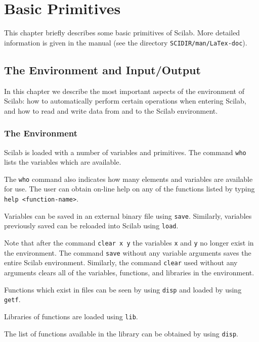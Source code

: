 
\chapter{Basic Primitives}
\label{ch5}
This chapter briefly describes some basic primitives of Scilab.
More detailed information is given in the manual 
(see the directory {\tt SCIDIR/man/LaTex-doc}).
\section{The Environment and Input/Output}
	In this chapter we describe the most important aspects
of the environment of Scilab: how to automatically
perform certain operations when entering Scilab,
and how to read and write data
from and to the Scilab environment.

\subsection{The Environment}
\label{s5.1}

 Scilab is loaded with a number of variables and primitives.
The command {\tt who} lists the variables 
which are available.  

The {\tt who} command also indicates how many elements and variables
are available for use.  The user can obtain on-line help on any of 
the functions listed by typing {\tt help <function-name>}.

	Variables can be saved in an external binary
file using {\tt save}.  
Similarly, variables previously saved can be
reloaded into Scilab using {\tt load}.

Note that after the command {\tt clear x y} 
 the variables {\tt x} and
{\tt y} no longer exist in the environment.  
The command {\tt save} without any variable arguments saves the entire 
Scilab environment.  Similarly,
the command {\tt clear} used
without any arguments clears all of the variables, functions, and libraries
in the environment.

	Functions which exist in files can be seen by using {\tt disp}
and loaded by using {\tt getf}.  

Libraries of functions are loaded
using {\tt lib}.  

The list of functions available in the library can be obtained by using {\tt disp}.

